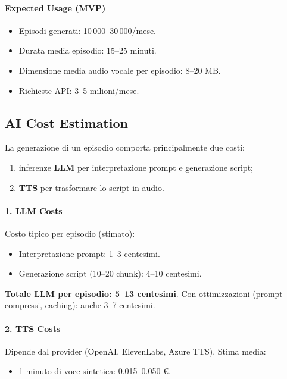 \documentclass[11pt,a4paper]{article}
\begin{document}
\paragraph{Expected Usage (MVP)}
\begin{itemize}
    \item Episodi generati: 10\,000--30\,000/mese.
    \item Durata media episodio: 15--25 minuti.
    \item Dimensione media audio vocale per episodio: 8--20 MB.
    \item Richieste API: 3--5 milioni/mese.
\end{itemize}


\subsection{AI Cost Estimation}

La generazione di un episodio comporta principalmente due costi:
\begin{enumerate}
    \item inferenze \textbf{LLM} per interpretazione prompt e generazione script;
    \item \textbf{TTS} per trasformare lo script in audio.
\end{enumerate}

\paragraph{1. LLM Costs}

Costo tipico per episodio (stimato):
\begin{itemize}
    \item Interpretazione prompt: 1--3 centesimi.
    \item Generazione script (10--20 chunk): 4--10 centesimi.
\end{itemize}

\textbf{Totale LLM per episodio: 5--13 centesimi}.  
Con ottimizzazioni (prompt compressi, caching): anche 3--7 centesimi.

\paragraph{2. TTS Costs}

Dipende dal provider (OpenAI, ElevenLabs, Azure TTS).  
Stima media:

\begin{itemize}
    \item 1 minuto di voce sintetica: 0.015--0.050 €.
\end{itemize}
\end{document}

